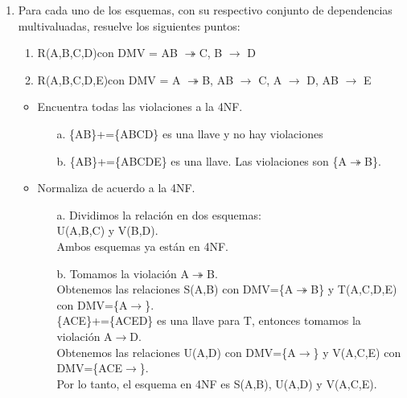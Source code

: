\documentclass[a4paper, 12pt]{report}
\begin{document}
\begin{enumerate}
\item Para  cada  uno  de  los  esquemas,  con  su  respectivo  conjunto  de  dependencias  multivaluadas, resuelve los siguientes puntos:\\
\begin{enumerate}
	\item R(A,B,C,D)con DMV = {AB $\twoheadrightarrow$C, B $\rightarrow$ D}
	\item R(A,B,C,D,E)con DMV = { A $\twoheadrightarrow$B, AB $\rightarrow$ C, A $\rightarrow$ D, AB $\rightarrow$ E}\\
\end{enumerate}
\begin{itemize}
	\item Encuentra todas las violaciones a la 4NF.\\
        \begin{itemize}
        \item[a.]\{AB\}+=\{ABCD\} es una llave y no hay violaciones
        \item[b.]\{AB\}+=\{ABCDE\} es una llave. Las violaciones son
            \{A$\twoheadrightarrow$B\}.\\
        \end{itemize}
	\item Normaliza de acuerdo a la 4NF.\\
    \begin{itemize}
        \item[a.] Dividimos la relación en dos esquemas:\\
            U(A,B,C) y V(B,D).\\
            Ambos esquemas ya están en 4NF.
        \item[b.] Tomamos la violación A$\twoheadrightarrow$B.\\
            Obtenemos las relaciones S(A,B) con DMV=\{A$\twoheadrightarrow$B\} y
            T(A,C,D,E) con DMV=\{A$\rightarrow$\}.\\
            \{ACE\}+=\{ACED\} es una llave para T, entonces tomamos la violación
            A$\rightarrow$D.\\
            Obtenemos las relaciones U(A,D) con DMV=\{A$\rightarrow$\} y
            V(A,C,E) con DMV=\{ACE$\rightarrow$\}.\\
            Por lo tanto, el esquema en 4NF es S(A,B), U(A,D) y V(A,C,E).
    \end{itemize}
\end{itemize}


\end{enumerate}
\end{document}
